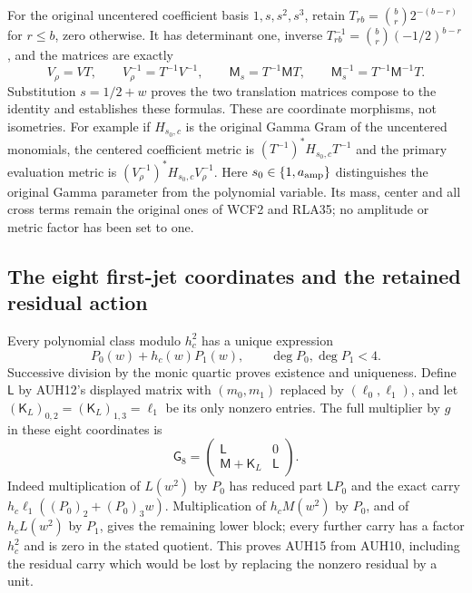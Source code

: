 \documentclass[11pt]{article}
\begin{document}
For the original uncentered coefficient basis $1,s,s^2,s^3$, retain
$T_{rb}=\binom br2^{-(b-r)}$ for $r\le b$, zero otherwise.
It has determinant one, inverse
$T^{-1}_{rb}=\binom br(-1/2)^{b-r}$, and the matrices are exactly
\[
 V_\rho=VT,\qquad
 V_\rho^{-1}=T^{-1}V^{-1},\qquad
 \mathsf M_s=T^{-1}\mathsf M T,\qquad
 \mathsf M_s^{-1}=T^{-1}\mathsf M^{-1}T.
 \tag{AUH14}
\]
Substitution $s=1/2+w$ proves the two translation matrices compose
to the identity and establishes these formulas.
These are coordinate morphisms, not isometries.
For example if $H_{s_0,c}$ is the original Gamma Gram of the
uncentered monomials, the centered coefficient metric is
$(T^{-1})^*H_{s_0,c}T^{-1}$ and the primary evaluation metric is
$(V_\rho^{-1})^*H_{s_0,c}V_\rho^{-1}$.
Here $s_0\in\{1,a_{\rm amp}\}$ distinguishes the original
Gamma parameter from the polynomial variable.  Its mass, center
and all cross terms remain the original ones of WCF2 and RLA35;
no amplitude or metric factor has been set to one.

\subsection{The eight first-jet coordinates and the retained residual action}

Every polynomial class modulo $h_c^2$ has a unique expression
\[
 P_0(w)+h_c(w)P_1(w),\qquad \deg P_0,\deg P_1<4.
\]
Successive division by the monic quartic proves existence and
uniqueness.  Define $\mathsf L$ by AUH12's displayed matrix with
$(m_0,m_1)$ replaced by $(\ell_0,\ell_1)$, and let
$(\mathsf K_L)_{0,2}=(\mathsf K_L)_{1,3}=\ell_1$ be its only
nonzero entries.  The full multiplier by $g$ in these eight
coordinates is
\[
 \mathsf G_8=
 \begin{pmatrix}\mathsf L&0\\\mathsf M+\mathsf K_L&\mathsf L\end{pmatrix}.
 \tag{AUH15}
\]
Indeed multiplication of $L(w^2)$ by $P_0$ has reduced part
$\mathsf L P_0$ and the exact carry
$h_c\ell_1((P_0)_2+(P_0)_3w)$.
Multiplication of $h_cM(w^2)$ by $P_0$, and of $h_cL(w^2)$ by
$P_1$, gives the remaining lower block; every further carry has
a factor $h_c^2$ and is zero in the stated quotient.
This proves AUH15 from AUH10, including the residual carry which
would be lost by replacing the nonzero residual by a unit.
\end{document}
